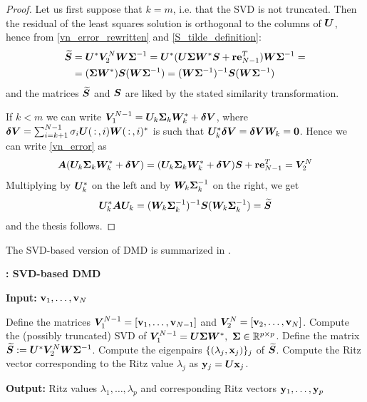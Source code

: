 \begin{proof}
Let us first suppose that $k=m$, i.e. that the SVD is not truncated. Then the residual of the least squares solution is orthogonal to the columns of $\vb*{U}$, hence from \eqref{vn_error_rewritten} and \eqref{S_tilde_definition}:
\begin{equation*}
    \begin{split}
    \widetilde{\vb*{S}} & =
    \vb*{U}^*\vb*{V}_2^N\vb*{W}\vb*{\Sigma}^{-1} =
    \vb*{U}^*(\vb*{U}\vb*{\Sigma}\vb*{W}^*\vb*{S} + \vb{r}\vb{e}_{N-1}^T)\vb*{W}\vb*{\Sigma}^{-1} = \\
    & = (\vb*{\Sigma}\vb*{W}^*) \vb*{S} (\vb*{W}\vb*{\Sigma}^{-1}) =
    (\vb*{W}\vb*{\Sigma}^{-1})^{-1} \vb*{S} (\vb*{W}\vb*{\Sigma}^{-1})    
    \end{split}
\end{equation*}
and the matrices $\widetilde{\vb*{S}}$ and $\vb*{S}$ are liked by the stated similarity transformation.

If $k < m$ we can write $\vb*{V}_1^{N-1} ={ \vb*{U}_k\vb*{\Sigma}_k\vb*{W}^{*}_k + \vb*{\delta V}}$, where $\vb*{\delta V} = {\sum_{i = k+1}^{N-1}\sigma_i\vb*{U}(\,:\,, i)\vb*{W}(\,:\,, i)^*}$ is such that $\vb*{U}_k^{*}\vb*{\delta V} = \vb*{\delta V}\vb*{W}_k = \vb*{0}$. Hence we can write \eqref{vn_error} as
\begin{equation*}
    \vb*{A}(\vb*{U}_k\vb*{\Sigma}_k\vb*{W}^{*}_k + \vb*{\delta V}) = (\vb*{U}_k\vb*{\Sigma}_k\vb*{W}^{*}_k + \vb*{\delta V})\vb*{S} + \vb{r}\vb{e}_{N-1}^T = \vb*{V}_2^N
\end{equation*}
Multiplying by $\vb*{U}_k^*$ on the left and by $\vb*{W}_k\vb*{\Sigma}_k^{-1}$ on the right, we get
\begin{equation*}
    \vb*{U}_k^{*}\vb*{A}\vb*{U}_k = (\vb*{W}_k\vb*{\Sigma}^{-1}_k)^{-1} \vb*{S} (\vb*{W}_k\vb*{\Sigma}^{-1}_k) = \widetilde{\vb*{S}} 
\end{equation*}
and the thesis follows.
\end{proof}

The SVD-based version of DMD is summarized in .

\begin{algorithm}
\caption{\textbf{: SVD-based DMD}}
\label{alg_dmd}
\textbf{Input:} $\vb{v}_1,\dots, \vb{v}_N$
\begin{algorithmic}[1]
\State Define the matrices $\vb*{V}_1^{N-1} = \left[\vb{v}_1,\dots,\vb{v}_{N-1}\right]$ and $\vb*{V}_2^{N} = \left[\vb{v}_2,\dots,\vb{v}_{N}\right]$.
\State Compute the (possibly truncated) SVD of $\vb*{V}_1^{N-1} = \vb*{U}\vb*{\Sigma}\vb*{W}^*,\,\, \vb*{\Sigma}\in\mathbb{R}^{p\times p}$.
\State Define the matrix $\widetilde{\vb*{S}} := \vb*{U}^*\vb*{V}_2^N\vb*{W}\vb*{\Sigma}^{-1}$.
\State Compute the eigenpairs $\{(\lambda_j, \vb{x}_j)\}_j$ of $\widetilde{\vb*{S}}$.
\State Compute the Ritz vector corresponding to the Ritz value $\lambda_j$ as $\vb{y}_j = \vb*{U}\vb{x}_j$. 
\end{algorithmic}
\textbf{Output:} Ritz values $\lambda_1,\dots,\lambda_{p}$ and corresponding Ritz vectors $\vb{y}_1,\dots, \vb{y}_p$
\end{algorithm}

